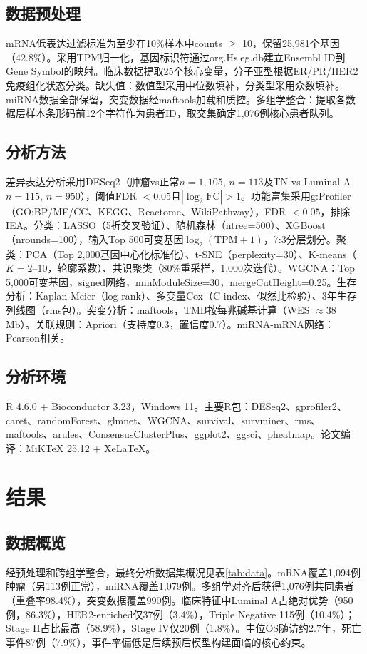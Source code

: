 \documentclass[12pt,a4paper]{ctexart}
\begin{document}
\subsection{数据预处理}
mRNA低表达过滤标准为至少在10\%样本中counts $\geq$ 10，保留25,981个基因（42.8\%）。采用TPM归一化，基因标识符通过org.Hs.eg.db建立Ensembl ID到Gene Symbol的映射。临床数据提取25个核心变量，分子亚型根据ER/PR/HER2免疫组化状态分类。缺失值：数值型采用中位数填补，分类型采用众数填补。miRNA数据全部保留，突变数据经maftools\cite{mayakonda2018maftools}加载和质控。多组学整合：提取各数据层样本条形码前12个字符作为患者ID，取交集确定1,076例核心患者队列。

\subsection{分析方法}
差异表达分析采用DESeq2\cite{love2014moderated}（肿瘤vs正常$n=1,105$, $n=113$及TN vs Luminal A $n=115$, $n=950$），阈值FDR $<0.05$且$|\log_2\text{FC}|>1$。功能富集采用g:Profiler\cite{kolberg2023gprofiler}（GO:BP/MF/CC、KEGG、Reactome、WikiPathway），FDR $<0.05$，排除IEA。分类：LASSO（5折交叉验证）、随机森林（ntree=500）、XGBoost（nrounds=100），输入Top 500可变基因$\log_2(\text{TPM}+1)$，7:3分层划分。聚类：PCA（Top 2,000基因中心化标准化）、t-SNE（perplexity=30）、K-means（$K=2$--10，轮廓系数）、共识聚类\cite{wilkerson2010consensus}（80\%重采样，1,000次迭代）。WGCNA\cite{langfelder2008wgcna}：Top 5,000可变基因，signed网络，minModuleSize=30，mergeCutHeight=0.25。生存分析：Kaplan-Meier（log-rank）、多变量Cox（C-index、似然比检验）、3年生存列线图（rms包）。突变分析：maftools\cite{mayakonda2018maftools}，TMB按每兆碱基计算（WES $\approx$38 Mb）。关联规则：Apriori（支持度0.3，置信度0.7）。miRNA-mRNA网络：Pearson相关。

\subsection{分析环境}
R 4.6.0 + Bioconductor 3.23，Windows 11。主要R包：DESeq2、gprofiler2、caret、randomForest、glmnet、WGCNA、survival、survminer、rms、maftools、arules、ConsensusClusterPlus、ggplot2、ggsci、pheatmap。论文编译：MiKTeX 25.12 + XeLaTeX。

\section{结果}

\subsection{数据概览}
经预处理和跨组学整合，最终分析数据集概况见表\ref{tab:data}。mRNA覆盖1,094例肿瘤（另113例正常），miRNA覆盖1,079例。多组学对齐后获得1,076例共同患者（重叠率98.4\%），突变数据覆盖990例。临床特征中Luminal A占绝对优势（950例，86.3\%），HER2-enriched仅37例（3.4\%），Triple Negative 115例（10.4\%）；Stage II占比最高（58.9\%），Stage IV仅20例（1.8\%）。中位OS随访约2.7年，死亡事件87例（7.9\%），事件率偏低是后续预后模型构建面临的核心约束。
\end{document}
